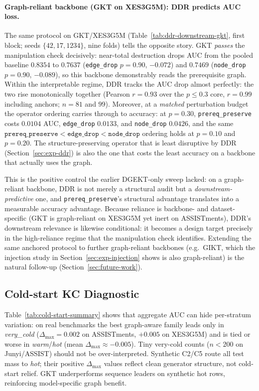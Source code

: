 \documentclass[pdflatex,sn-mathphys-num]{sn-jnl}
\newcommand{\DDR}{\textsc{DDR}}
\begin{document}
\paragraph{Graph-reliant backbone (GKT on XES3G5M): \DDR{} predicts AUC loss.}
The same protocol on GKT/XES3G5M (Table~\ref{tab:ddr-downstream-gkt}, first
block; seeds $\{42,17,1234\}$, nine folds) tells the opposite story. GKT \emph{passes} the
manipulation check decisively: near-total destruction drops AUC from the
pooled baseline $0.8354$ to $0.7637$ (\texttt{edge\_drop} $p{=}0.90$, ${-}0.072$) and
$0.7469$ (\texttt{node\_drop} $p{=}0.90$, ${-}0.089$), so this backbone
demonstrably reads the prerequisite graph. Within the interpretable regime,
\DDR{} tracks the AUC drop almost perfectly: the two rise monotonically together
(Pearson $r{=}0.93$ over the $p{\le}0.3$ core, $r{=}0.99$ including anchors;
$n{=}81$ and $99$). Moreover, at a \emph{matched} perturbation budget the
operator ordering carries through to accuracy: at $p{=}0.30$,
\texttt{prereq\_preserve} costs $0.0104$ AUC, \texttt{edge\_drop} $0.0133$, and
\texttt{node\_drop} $0.0426$, and the same
$\texttt{prereq\_preserve}<\texttt{edge\_drop}<\texttt{node\_drop}$ ordering
holds at $p{=}0.10$ and $p{=}0.20$. The structure-preserving operator that is
least disruptive by \DDR{} (Section~\ref{sec:exp-ddr}) is also the one that
costs the least accuracy on a backbone that actually uses the graph.

This is the positive control the earlier DGEKT-only sweep lacked: on a
graph-reliant backbone, \DDR{} is not merely a structural audit but a
\emph{downstream-predictive} one, and \texttt{prereq\_preserve}'s structural
advantage translates into a measurable accuracy advantage. Because reliance is
backbone- and dataset-specific (GKT is graph-reliant on XES3G5M yet inert on
ASSISTments), \DDR{}'s downstream relevance is likewise conditional: it becomes
a design target precisely in the high-reliance regime that the manipulation
check identifies. Extending the same anchored protocol to further graph-reliant
backbones (e.g.\ GIKT, which the injection study in
Section~\ref{sec:exp-injection} shows is also graph-reliant) is the natural
follow-up (Section~\ref{sec:future-work}).
\subsection{Cold-start KC Diagnostic}
\label{sec:exp-coldstart}

Table~\ref{tab:cold-start-summary} shows that aggregate AUC can hide
per-stratum variation: on real benchmarks the best graph-aware family
leads only in \emph{very\_cold} ($\Delta_{\max}{=}0.002$ on ASSISTments,
$+0.005$ on XES3G5M) and is tied or worse in \emph{warm}/\emph{hot}
(mean $\Delta_{\max}{\approx}{-}0.005$). Tiny very-cold counts ($n{<}200$
on Junyi/ASSIST) should not be over-interpreted. Synthetic C2/C5 route
all test mass to \emph{hot}; their positive $\Delta_{\max}$ values
reflect clean generator structure, not cold-start relief. GKT underperforms
sequence leaders on synthetic hot rows, reinforcing model-specific graph benefit.
\end{document}
